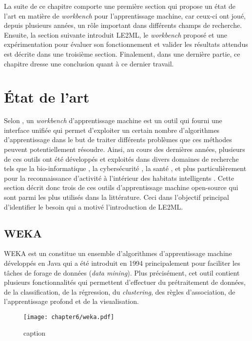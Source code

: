 La suite de ce chapitre comporte une première section qui propose un état de l'art en matière de \textit{workbench} pour l'apprentissage machine, car ceux-ci ont joué, depuis plusieurs années, un rôle important dans différents champs de recherche. Ensuite, la section suivante introduit \acs{LE2ML}, le \textit{workbench} proposé et une expérimentation pour évaluer son fonctionnement et valider les résultats attendus est décrite dans une troisième section. Finalement, dans une dernière partie, ce chapitre dresse une conclusion quant à ce dernier travail.

\section{État de l'art}

Selon \cite{Langlois2008}, un \textit{workbench} d'apprentissage machine est un outil qui fourni une interface unifiée qui permet d'exploiter un certain nombre d'algorithmes d'apprentissage dans le but de traiter différents problèmes que ces méthodes peuvent potentiellement résoudre. Ainsi, au cours des dernières années, plusieurs de ces outils ont été développés et exploités dans divers domaines de recherche tels que la bio-informatique \citep{Larranaga2006}, la cybersécurité \citep{Handa2019}, la santé \citep{Rajkomar2019}, et plus particulièrement pour la reconnaissance d'activité à l'intérieur des habitats intelligents \citep{Ramirez-Prado2019}. Cette section décrit donc trois de ces outils d'apprentissage machine open-source qui sont parmi les plus utilisés dans la littérature. Ceci dans l'objectif principal d'identifier le besoin qui a motivé l'introduction de \acs{LE2ML}.

\subsection{WEKA}

\acs{WEKA} est un constitue un ensemble d'algorithmes d'apprentissage machine développés en Java qui a été introduit en 1994 principalement pour faciliter les tâches de forage de données (\textit{data mining}). Plus précisément, cet outil contient plusieurs fonctionnalités qui permettent d'effectuer du prétraitement de données, de la classification, de la régression, du \textit{clustering}, des règles d'association, de l'apprentissage profond et de la visualisation.

\begin{figure}[H]
	\centering
	\texttt{[image: chapter6/weka.pdf]}
        \caption{caption}
	\label{fig:weka}
\end{figure}


